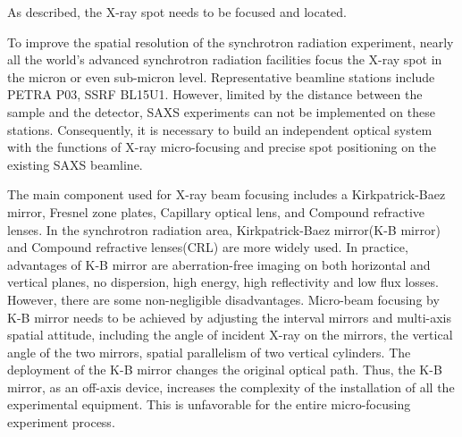 \documentclass{Head}
\begin{document}
As described, the X-ray spot needs to be focused and located.


To improve the spatial resolution of the synchrotron radiation experiment, nearly all the world’s advanced synchrotron radiation facilities focus the X-ray spot in the micron or even sub-micron level.
Representative beamline stations include PETRA \uppercase\expandafter{} P03, SSRF BL15U1\cite{RN38}.
However, limited by the distance between the sample and the detector, SAXS experiments can not be implemented on these stations.
Consequently, it is necessary to build an independent optical system with the functions of X-ray micro-focusing and precise spot positioning on the existing SAXS beamline.


The main component used for X-ray beam focusing includes a Kirkpatrick-Baez mirror\cite{RN132KBmirror}, Fresnel zone plates, Capillary optical lens\cite{RN133glasscapillaries}, and Compound refractive lenses\cite{RN134firstCRL,RN135CRL}.
In the synchrotron radiation area, Kirkpatrick-Baez mirror(K-B mirror) and Compound refractive lenses(CRL) are more widely used.
In practice, advantages of K-B mirror are aberration-free imaging on both horizontal and vertical planes, no dispersion, high energy, high reflectivity and low flux losses.
However, there are some non-negligible disadvantages.
Micro-beam focusing by K-B mirror needs to be achieved by adjusting the interval mirrors and multi-axis spatial attitude, including the angle of incident X-ray on the mirrors, the vertical angle of the two mirrors, spatial parallelism of two vertical cylinders.
The deployment of the K-B mirror changes the original optical path.
Thus, the K-B mirror, as an off-axis device, increases the complexity of the installation of all the experimental equipment.
This is unfavorable for the entire micro-focusing experiment process.
\end{document}

